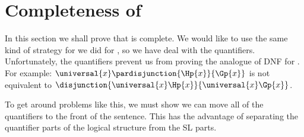 \section{Completeness of \GQD{}}\label{Sec:Completeness of GQD}

In this section we shall prove that \GQD{} is complete.  We would like to use the same kind of strategy for \GQD{} we did for \GSD{}, so we have deal with the quantifiers.
Unfortunately, the quantifiers prevent us from proving the analogue of DNF for \GQL{}. For example:  $\universal{\variable{x}}\pardisjunction{\Hp{\variable{x}}}{\Gp{\variable{x}}}$ is not equivalent to $\disjunction{\universal{\variable{x}}\Hp{\variable{x}}}{\universal{\variable{x}}\Gp{\variable{x}}}$.

To get around problems like this, we must show we can move all of the quantifiers to the front of the sentence.  This has the advantage of separating the quantifier parts of the logical structure from the SL parts.


